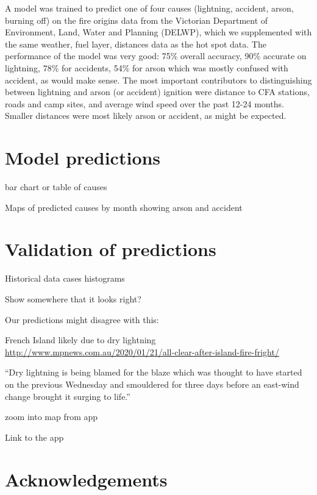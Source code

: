 \documentclass[
  11pt,
  a4paper,
]{article}
\begin{document}
A model was trained to predict one of four causes (lightning, accident, arson, burning off) on the fire origins data from the Victorian Department of Environment, Land, Water and Planning (DELWP), which we supplemented with the same weather, fuel layer, distances data as the hot spot data. The performance of the model was very good: 75\% overall accuracy, 90\% accurate on lightning, 78\% for accidents, 54\% for arson which was mostly confused with accident, as would make sense. The most important contributors to distinguishing between lightning and arson (or accident) ignition were distance to CFA stations, roads and camp sites, and average wind speed over the past 12-24 months. Smaller distances were most likely arson or accident, as might be expected.

\hypertarget{models}{%
\section{Model predictions}\label{models}}

bar chart or table of causes

Maps of predicted causes by month showing arson and accident

\hypertarget{validation-of-predictions}{%
\section*{Validation of predictions}\label{validation-of-predictions}}

Historical data cases histograms

Show somewhere that it looks right?

Our predictions might disagree with this:

French Island likely due to dry lightning
\url{http://www.mpnews.com.au/2020/01/21/all-clear-after-island-fire-fright/}

``Dry lightning is being blamed for the blaze which was thought to have started on the previous Wednesday and smouldered for three days before an east-wind change brought it surging to life.''

zoom into map from app

Link to the app

\hypertarget{acknowledgements}{%
\section{Acknowledgements}\label{acknowledgements}}
\end{document}
